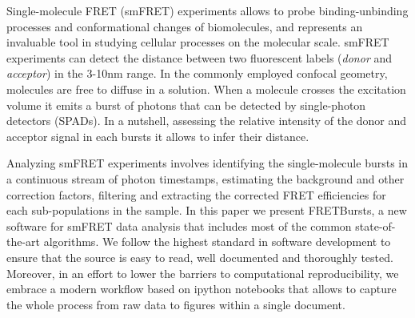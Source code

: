 Single-molecule FRET (smFRET) experiments allows to probe binding-unbinding processes and conformational changes of biomolecules, and represents an invaluable tool in studying cellular processes on the molecular scale\cite{Kapanidis_2006}. smFRET experiments can detect the distance between two fluorescent labels (\textit{donor} and \textit{acceptor}) in the 3-10nm range. In the commonly employed confocal geometry, molecules are free to diffuse in a solution. When a molecule crosses the excitation volume it emits a burst of photons that can be detected by single-photon detectors (SPADs). In a nutshell, assessing the relative intensity of the donor and acceptor signal in each bursts it allows to infer their distance. 

Analyzing smFRET experiments involves identifying the single-molecule bursts in a continuous stream of photon timestamps, estimating the background and other correction factors, filtering and extracting the corrected FRET efficiencies for each sub-populations in the sample. In this paper we present FRETBursts, a new software for smFRET data analysis that includes most of the common state-of-the-art algorithms. We follow the highest standard in software development to ensure that the source is easy to read, well documented and thoroughly tested. Moreover, in an effort to lower the barriers to computational reproducibility, we embrace a modern workflow based on ipython notebooks that allows to capture the whole process from raw data to figures within a single document.
